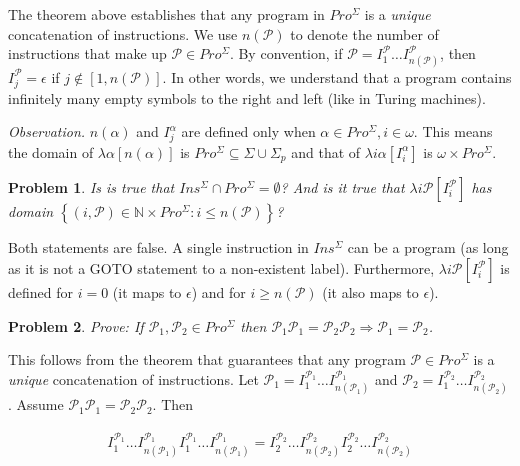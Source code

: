 \documentclass[a4paper, 12pt]{article}
\newtheorem{problem}{Problem}
\newtheorem{problem}{Problem}
\begin{document}
The theorem above establishes that any program in $Pro^{\Sigma}$ is a
\textit{unique} concatenation of instructions. We use $n(\mathcal{P})$ to denote
the number of instructions that make up $\mathcal{P} \in Pro^{\Sigma}$. By
convention, if $\mathcal{P} = I^{\mathcal{P}}_1 \ldots
I^{\mathcal{P}}_{n(\mathcal{P})}$, then $I^{\mathcal{P}}_j =
\epsilon$ if $j \not\in [1, n(\mathcal{P})]$. In other words, we understand that
a program contains infinitely many empty symbols to the right and left (like in
Turing machines).

\textit{Observation.} $n(\alpha)$ and $I_j^{\alpha}$ are defined only when
$\alpha \in Pro^{\Sigma}, i \in \omega$. This means the domain of $\lambda
\alpha[n(\alpha)]$ is $Pro^{\Sigma} \subseteq \Sigma \cup \Sigma_p$ and that of
$\lambda i\alpha[I_i^{\alpha}]$ is $\omega \times Pro^{\Sigma}$.

\begin{problem}
    Is is true that $Ins^{\Sigma} \cap Pro^{\Sigma} = \emptyset$? And is it true
    that $\lambda i \mathcal{P} [I_i^{\mathcal{P}}]$ has domain $\left\{ (i,
    \mathcal{P}) \in \mathbb{N} \times Pro^{\Sigma}: i \leq n(\mathcal{P})
\right\} $?
\end{problem}

Both statements are false. A single instruction in $Ins^{\Sigma}$ can be a
program (as long as it is not a GOTO statement to a non-existent label).
Furthermore, $\lambda i \mathcal{P} [I_i^{\mathcal{P}}]$ is defined for $i = 0$
(it maps to $\epsilon$) and for $i \geq n(\mathcal{P} )$ (it also maps to
$\epsilon$).

\begin{problem}
    Prove: If $\mathcal{P}_1, \mathcal{P}_2 \in Pro^{\Sigma}$ then $\mathcal{P}_1
    \mathcal{P}_1 = \mathcal{P}_2 \mathcal{P}_2 \Rightarrow \mathcal{P}_1 =
    \mathcal{P}_2$.
\end{problem}

This follows from the theorem that guarantees that any program $\mathcal{P} \in
Pro^{\Sigma}$ is a \textit{unique} concatenation of instructions. Let
$\mathcal{P}_1 = I_1^{\mathcal{P}_1} \ldots I_{n(\mathcal{P}_1)}^{\mathcal{P}_1}$ and $\mathcal{P}_2 = I_1^{\mathcal{P}_2}
\ldots I_{n(\mathcal{P}_2)}^{\mathcal{P}_2}$. Assume $\mathcal{P}_1\mathcal{P}_1 =
\mathcal{P}_2 \mathcal{P}_2$. Then 

\begin{align*}
    I_1^{\mathcal{P}_1} \ldots I_{n(\mathcal{P}_1)}^{\mathcal{P}_1}
    I_1^{\mathcal{P}_1} \ldots I_{n(\mathcal{P}_1)}^{\mathcal{P}_1} = 
    I_2^{\mathcal{P}_2} \ldots I_{n(\mathcal{P}_2)}^{\mathcal{P}_2}
    I_2^{\mathcal{P}_2} \ldots I_{n(\mathcal{P}_2)}^{\mathcal{P}_2}
\end{align*}
\end{document}
